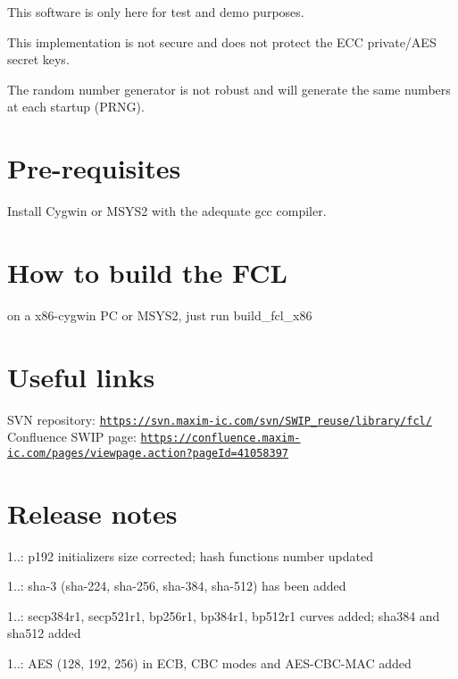\begin{DoxyItemize}
\item This software is only here for test and demo purposes.
\item This implementation is not secure and does not protect the E\+CC private/\+A\+ES secret keys.
\item The random number generator is not robust and will generate the same numbers at each startup (P\+R\+NG).
\end{DoxyItemize}\hypertarget{index_Req}{}\section{Pre-\/requisites}\label{index_Req}
Install Cygwin or M\+S\+Y\+S2 with the adequate gcc compiler.\hypertarget{index_Build}{}\section{How to build the F\+CL}\label{index_Build}
on a x86-\/cygwin PC or M\+S\+Y\+S2, just run build\+\_\+fcl\+\_\+x86\hypertarget{index_Links}{}\section{Useful links}\label{index_Links}
S\+VN repository\+: \href{https://svn.maxim-ic.com/svn/SWIP_reuse/library/fcl/}{\tt https\+://svn.\+maxim-\/ic.\+com/svn/\+S\+W\+I\+P\+\_\+reuse/library/fcl/} Confluence S\+W\+IP page\+: \href{https://confluence.maxim-ic.com/pages/viewpage.action?pageId=41058397}{\tt https\+://confluence.\+maxim-\/ic.\+com/pages/viewpage.\+action?page\+Id=41058397}\hypertarget{index_ReleaseNotes}{}\section{Release notes}\label{index_ReleaseNotes}

\begin{DoxyItemize}
\item 1..\+: p192 initializers size corrected; hash functions number updated
\item 1..\+: sha-\/3 (sha-\/224, sha-\/256, sha-\/384, sha-\/512) has been added
\item 1..\+: secp384r1, secp521r1, bp256r1, bp384r1, bp512r1 curves added; sha384 and sha512 added
\item 1..\+: A\+ES (128, 192, 256) in E\+CB, C\+BC modes and A\+E\+S-\/\+C\+B\+C-\/\+M\+AC added
\end{DoxyItemize}